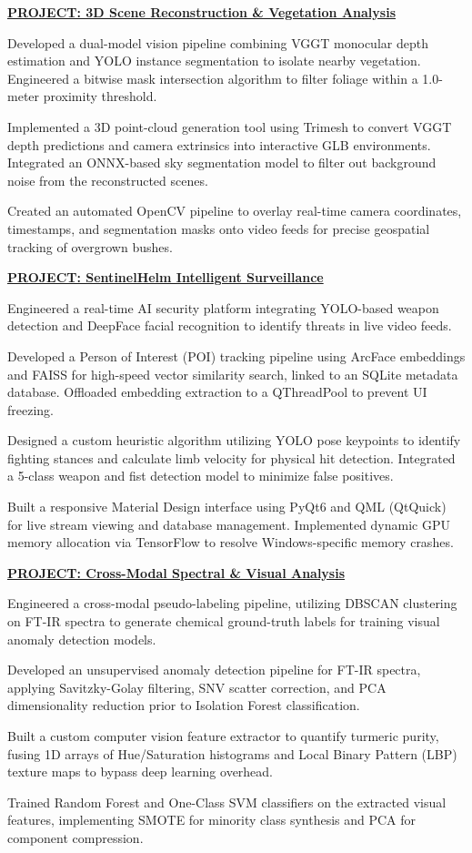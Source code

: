 \documentclass[letterpaper,11pt]{article}
\newcommand{\resumeItem}[1]{
  \item\small{
    {#1 \vspace{-2pt}}
  }
}
\begin{document}
        \vspace{4pt}
        \resumeItem{\textbf{\underline{PROJECT: 3D Scene Reconstruction \& Vegetation Analysis}}}
        \resumeItem{Developed a dual-model vision pipeline combining VGGT monocular depth estimation and YOLO instance segmentation to isolate nearby vegetation. Engineered a bitwise mask intersection algorithm to filter foliage within a 1.0-meter proximity threshold.}
        \resumeItem{Implemented a 3D point-cloud generation tool using Trimesh to convert VGGT depth predictions and camera extrinsics into interactive GLB environments. Integrated an ONNX-based sky segmentation model to filter out background noise from the reconstructed scenes.}
        \resumeItem{Created an automated OpenCV pipeline to overlay real-time camera coordinates, timestamps, and segmentation masks onto video feeds for precise geospatial tracking of overgrown bushes.}

        \vspace{4pt}
        \resumeItem{\textbf{\underline{PROJECT: SentinelHelm Intelligent Surveillance}}}
        \resumeItem{Engineered a real-time AI security platform integrating YOLO-based weapon detection and DeepFace facial recognition to identify threats in live video feeds.}
        \resumeItem{Developed a Person of Interest (POI) tracking pipeline using ArcFace embeddings and FAISS for high-speed vector similarity search, linked to an SQLite metadata database. Offloaded embedding extraction to a QThreadPool to prevent UI freezing.}
        \resumeItem{Designed a custom heuristic algorithm utilizing YOLO pose keypoints to identify fighting stances and calculate limb velocity for physical hit detection. Integrated a 5-class weapon and fist detection model to minimize false positives.}
        \resumeItem{Built a responsive Material Design interface using PyQt6 and QML (QtQuick) for live stream viewing and database management. Implemented dynamic GPU memory allocation via TensorFlow to resolve Windows-specific memory crashes.}

        \vspace{4pt}
        \resumeItem{\textbf{\underline{PROJECT: Cross-Modal Spectral \& Visual Analysis}}}
        \resumeItem{Engineered a cross-modal pseudo-labeling pipeline, utilizing DBSCAN clustering on FT-IR spectra to generate chemical ground-truth labels for training visual anomaly detection models.}
        \resumeItem{Developed an unsupervised anomaly detection pipeline for FT-IR spectra, applying Savitzky-Golay filtering, SNV scatter correction, and PCA dimensionality reduction prior to Isolation Forest classification.}
        \resumeItem{Built a custom computer vision feature extractor to quantify turmeric purity, fusing 1D arrays of Hue/Saturation histograms and Local Binary Pattern (LBP) texture maps to bypass deep learning overhead.}
        \resumeItem{Trained Random Forest and One-Class SVM classifiers on the extracted visual features, implementing SMOTE for minority class synthesis and PCA for component compression.}
\end{document}
